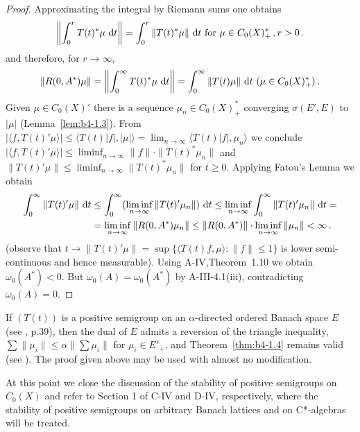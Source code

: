 \begin{proof}
Approximating the integral by Riemann sums one obtains 
\[
\left\|\int_0^r T(t)^*\mu \, \mathop{}\!\mathrm{d}{t}\right\| = \int_0^r \|T(t)^*\mu\| \, \mathop{}\!\mathrm{d}{t} \text{ for } \mu \in C_{0}(X)^*_{+}\,, r  >  0\,.
\]
and therefore, for $r \to \infty$, 
\[
\|R(0,A^*)\mu\| = \left\|\int_0^{\infty} T(t)^*\mu \, \mathop{}\!\mathrm{d}{t}\right\| 
 = \int_0^{\infty} \|T(t)\mu\| \, \mathop{}\!\mathrm{d}{t}\  (\mu \in C_{0}(X)_{+}^{*})\,.
\]
Given $\mu \in C_{0}(X)'$ there is a sequence $\mu_n \in C_{0}(X)^*_+$ converging $\sigma(E',E)$ to $|\mu|$ (Lemma~\ref{lem:b4-1.3}).
From $|\langle f,T(t)'\mu \rangle| \leq \langle T(t)|f|,|\mu| \rangle = \lim_{n\to\infty} \langle T(t)|f|,\mu_n \rangle$ we conclude $|\langle f,T(t)'\mu \rangle| \leq \liminf_{n\to\infty}\|f\| \cdot \|T(t)^*\mu_n\|$ and 
\\
$\|T(t)'\mu\| \leq \liminf_{n\to\infty}\|T(t)^*\mu_n\|$ for $t \geq 0$. 
Applying Fatou's Lemma we obtain 
\[
\begin{aligned}
	\int_0^{\infty} \|T(t)'\mu\| \, \mathop{}\!\mathrm{d}{t} &\leq \int_0^{\infty} (\liminf_{n\to\infty} \|T(t)'\mu_n\|) \, \mathop{}\!\mathrm{d}{t} \leq  
	\liminf_{n\to\infty} \int_0^{\infty} \|T(t)'\mu_n\| \, \mathop{}\!\mathrm{d}{t} = \\ 
	& = \liminf_{n\to\infty} \|R(0,A^{*})\mu_n\| \leq \|R(0,A^{*})\|\cdot\liminf_{n\to\infty} \|\mu_n\| < \infty\,.
\end{aligned}
\]
(observe that $t \to \|T(t)'\mu\| = \sup \{\langle T(t)f,\mu \rangle \colon \|f\| \leq 1\}$ is lower semi-continuous and hence measurable). 
Using A-IV,Theorem~1.10 we obtain $\omega_{0}(A^{*})<0$. 
But $\omega_{0}(A) = \omega_{0}(A^{*})$ by A-III-4.1(iii), contradicting $\omega_{0}(A) = 0$.
\end{proof}

\begin{remark}\label{rem:b4-1.5}
If $(T(t))$ is a positive semigroup on an $\alpha$-directed ordered Banach space $E$ (see \citet{asimow:1980}, p.39), 
then the dual of $E$ admits a reversion of the triangle inequality, 
\ie $\sum\|\mu_i\| \leq \alpha\|\sum\mu_i\|$ 
for $\mu_i \in E'_+$, 
and Theorem~\ref{thm:b4-1.4} remains valid (see \citet{battydavies:1983}). 
The proof given above may be used with almost no modification.
\end{remark}

At this point we close the discussion of the stability of positive semigroups on $C_{0}(X)$ and refer to Section 1 of C-IV and D-IV, respectively, where the stability of positive semigroups on arbitrary Banach lattices and on C*-algebras will be treated.

